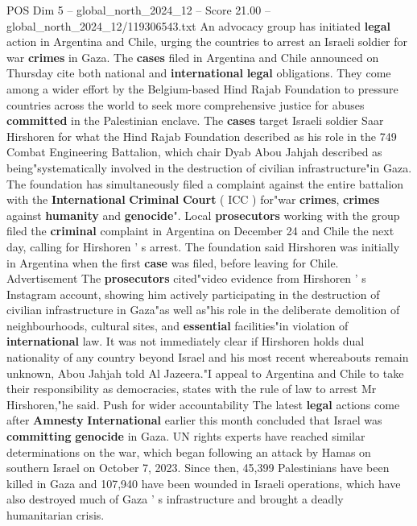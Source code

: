 \begin{textsample}{POS Dim 5 – global\_north\_2024\_12 – Score 21.00 – global\_north\_2024\_12/119306543.txt}  \label{ex:f5_pos_092}
An advocacy group has initiated \textbf{legal} action in Argentina and Chile, urging the countries to arrest an Israeli soldier for war \textbf{crimes} in Gaza.
The \textbf{cases} filed in Argentina and Chile announced on Thursday cite both national and \textbf{international} \textbf{legal} obligations.
They come among a wider effort by the Belgium-based Hind Rajab Foundation to pressure countries across the world to seek more comprehensive justice for abuses \textbf{committed} in the Palestinian enclave.
The \textbf{cases} target Israeli soldier Saar Hirshoren for what the Hind Rajab Foundation described as his role in the 749 Combat Engineering Battalion, which chair Dyab Abou Jahjah described as being"systematically involved in the destruction of civilian infrastructure"in Gaza.
The foundation has simultaneously filed a complaint against the entire battalion with the \textbf{International} \textbf{Criminal} \textbf{Court} ( ICC ) for"war \textbf{crimes}, \textbf{crimes} against \textbf{humanity} and \textbf{genocide}".
Local \textbf{prosecutors} working with the group filed the \textbf{criminal} complaint in Argentina on December 24 and Chile the next day, calling for Hirshoren ' s arrest.
The foundation said Hirshoren was initially in Argentina when the first \textbf{case} was filed, before leaving for Chile.
Advertisement The \textbf{prosecutors} cited"video evidence from Hirshoren ' s Instagram account, showing him actively participating in the destruction of civilian infrastructure in Gaza"as well as"his role in the deliberate demolition of neighbourhoods, cultural sites, and \textbf{essential} facilities"in violation of \textbf{international} law.
It was not immediately clear if Hirshoren holds dual nationality of any country beyond Israel and his most recent whereabouts remain unknown, Abou Jahjah told Al Jazeera."I appeal to Argentina and Chile to take their responsibility as democracies, states with the rule of law to arrest Mr Hirshoren,"he said.
Push for wider accountability The latest \textbf{legal} actions come after \textbf{Amnesty} \textbf{International} earlier this month concluded that Israel was \textbf{committing} \textbf{genocide} in Gaza.
UN rights experts have reached similar determinations on the war, which began following an attack by Hamas on southern Israel on October 7, 2023.
Since then, 45,399 Palestinians have been killed in Gaza and 107,940 have been wounded in Israeli operations, which have also destroyed much of Gaza ' s infrastructure and brought a deadly humanitarian crisis.

\end{textsample}
